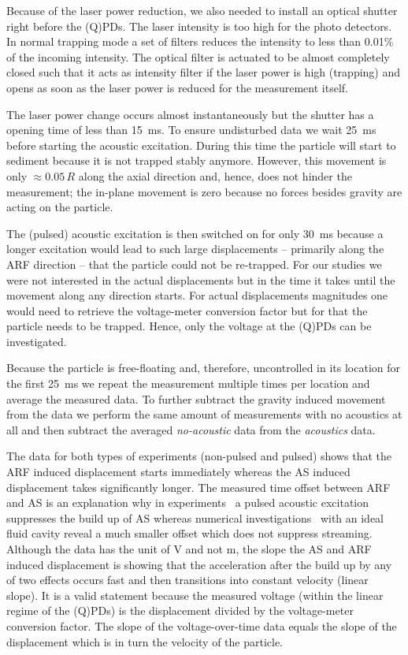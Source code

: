 Because of the laser power reduction, we also needed to install an optical 
shutter right before the (Q)PDs. The laser intensity is too high for the photo 
detectors. In normal trapping mode a set of filters reduces the intensity to 
less than 0.01\% of the incoming intensity. The optical filter is actuated to 
be almost completely closed such that it acts as intensity filter if the laser 
power is high (trapping) and opens as soon as the laser power is reduced for 
the measurement itself.

The laser power change occurs almost instantaneously but the shutter has a 
opening time of less than \SI{15}{\ms}. To ensure undisturbed data we wait 
\SI{25}{\ms} before starting the acoustic excitation. During this time the 
particle will start to sediment because it is not trapped stably anymore. 
However, this movement is only $\approx 0.05\,R$ along the axial direction and, 
hence, does not hinder the measurement; the in-plane movement is zero because 
no forces besides gravity are acting on the particle.

The (pulsed) acoustic excitation is then switched on for only \SI{30}{\ms} 
because a longer excitation would lead to such large displacements -- primarily 
along the ARF direction -- that the particle could not be re-trapped. For our 
studies we were not interested in the actual displacements but in the time it 
takes until the movement along any direction starts. For actual displacements 
magnitudes one would need to retrieve the voltage-meter conversion factor but 
for that the particle needs to be trapped. Hence, only the voltage at the 
(Q)PDs can be investigated.

Because the particle is free-floating and, therefore, uncontrolled in its 
location for the first \SI{25}{\ms} we repeat the measurement multiple times 
per location and average the measured data. To further subtract the gravity 
induced movement from the data we perform the same amount of measurements with 
no acoustics at all and then subtract the averaged \emph{no-acoustic} data from 
the \emph{acoustics} data.

The data for both types of experiments (non-pulsed and pulsed) shows that the 
ARF induced displacement starts immediately whereas the AS induced displacement 
takes significantly longer. The measured time offset between ARF and AS is an 
explanation why in experiments~\cite{Castro2016,Hoyos2013} a pulsed acoustic 
excitation suppresses the build up of AS whereas numerical 
investigations~\cite{Muller2015} with an ideal fluid cavity reveal a much 
smaller offset which does not suppress streaming. Although the data has the 
unit of \si{\volt} and not \si{\meter}, the slope the AS and ARF induced 
displacement is showing that the acceleration after the build up by any of two 
effects occurs fast and then transitions into constant velocity (linear slope). 
It is a valid statement because the measured voltage (within the linear regime 
of the (Q)PDs) is the displacement divided by the voltage-meter conversion 
factor. The slope of the voltage-over-time data equals the slope of the 
displacement which is in turn the velocity of the particle.

